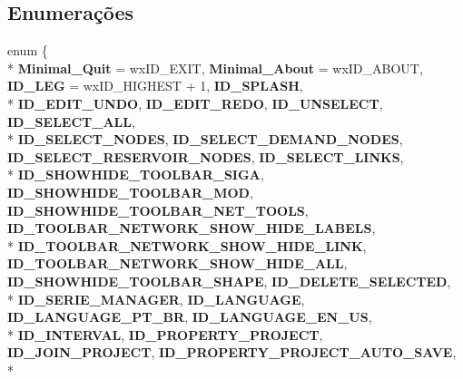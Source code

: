 \subsection*{Enumerações}
\begin{DoxyCompactItemize}
\item 
enum \{ \\*
{\bf Minimal\+\_\+\+Quit} = wx\+I\+D\+\_\+\+E\+X\+IT, 
{\bf Minimal\+\_\+\+About} = wx\+I\+D\+\_\+\+A\+B\+O\+UT, 
{\bf I\+D\+\_\+\+L\+EG} = wx\+I\+D\+\_\+\+H\+I\+G\+H\+E\+ST + 1, 
{\bf I\+D\+\_\+\+S\+P\+L\+A\+SH}, 
\\*
{\bf I\+D\+\_\+\+E\+D\+I\+T\+\_\+\+U\+N\+DO}, 
{\bf I\+D\+\_\+\+E\+D\+I\+T\+\_\+\+R\+E\+DO}, 
{\bf I\+D\+\_\+\+U\+N\+S\+E\+L\+E\+CT}, 
{\bf I\+D\+\_\+\+S\+E\+L\+E\+C\+T\+\_\+\+A\+LL}, 
\\*
{\bf I\+D\+\_\+\+S\+E\+L\+E\+C\+T\+\_\+\+N\+O\+D\+ES}, 
{\bf I\+D\+\_\+\+S\+E\+L\+E\+C\+T\+\_\+\+D\+E\+M\+A\+N\+D\+\_\+\+N\+O\+D\+ES}, 
{\bf I\+D\+\_\+\+S\+E\+L\+E\+C\+T\+\_\+\+R\+E\+S\+E\+R\+V\+O\+I\+R\+\_\+\+N\+O\+D\+ES}, 
{\bf I\+D\+\_\+\+S\+E\+L\+E\+C\+T\+\_\+\+L\+I\+N\+KS}, 
\\*
{\bf I\+D\+\_\+\+S\+H\+O\+W\+H\+I\+D\+E\+\_\+\+T\+O\+O\+L\+B\+A\+R\+\_\+\+S\+I\+GA}, 
{\bf I\+D\+\_\+\+S\+H\+O\+W\+H\+I\+D\+E\+\_\+\+T\+O\+O\+L\+B\+A\+R\+\_\+\+M\+OD}, 
{\bf I\+D\+\_\+\+S\+H\+O\+W\+H\+I\+D\+E\+\_\+\+T\+O\+O\+L\+B\+A\+R\+\_\+\+N\+E\+T\+\_\+\+T\+O\+O\+LS}, 
{\bf I\+D\+\_\+\+T\+O\+O\+L\+B\+A\+R\+\_\+\+N\+E\+T\+W\+O\+R\+K\+\_\+\+S\+H\+O\+W\+\_\+\+H\+I\+D\+E\+\_\+\+L\+A\+B\+E\+LS}, 
\\*
{\bf I\+D\+\_\+\+T\+O\+O\+L\+B\+A\+R\+\_\+\+N\+E\+T\+W\+O\+R\+K\+\_\+\+S\+H\+O\+W\+\_\+\+H\+I\+D\+E\+\_\+\+L\+I\+NK}, 
{\bf I\+D\+\_\+\+T\+O\+O\+L\+B\+A\+R\+\_\+\+N\+E\+T\+W\+O\+R\+K\+\_\+\+S\+H\+O\+W\+\_\+\+H\+I\+D\+E\+\_\+\+A\+LL}, 
{\bf I\+D\+\_\+\+S\+H\+O\+W\+H\+I\+D\+E\+\_\+\+T\+O\+O\+L\+B\+A\+R\+\_\+\+S\+H\+A\+PE}, 
{\bf I\+D\+\_\+\+D\+E\+L\+E\+T\+E\+\_\+\+S\+E\+L\+E\+C\+T\+ED}, 
\\*
{\bf I\+D\+\_\+\+S\+E\+R\+I\+E\+\_\+\+M\+A\+N\+A\+G\+ER}, 
{\bf I\+D\+\_\+\+L\+A\+N\+G\+U\+A\+GE}, 
{\bf I\+D\+\_\+\+L\+A\+N\+G\+U\+A\+G\+E\+\_\+\+P\+T\+\_\+\+BR}, 
{\bf I\+D\+\_\+\+L\+A\+N\+G\+U\+A\+G\+E\+\_\+\+E\+N\+\_\+\+US}, 
\\*
{\bf I\+D\+\_\+\+I\+N\+T\+E\+R\+V\+AL}, 
{\bf I\+D\+\_\+\+P\+R\+O\+P\+E\+R\+T\+Y\+\_\+\+P\+R\+O\+J\+E\+CT}, 
{\bf I\+D\+\_\+\+J\+O\+I\+N\+\_\+\+P\+R\+O\+J\+E\+CT}, 
{\bf I\+D\+\_\+\+P\+R\+O\+P\+E\+R\+T\+Y\+\_\+\+P\+R\+O\+J\+E\+C\+T\+\_\+\+A\+U\+T\+O\+\_\+\+S\+A\+VE}, 
\\*

\end{DoxyCompactItemize}
